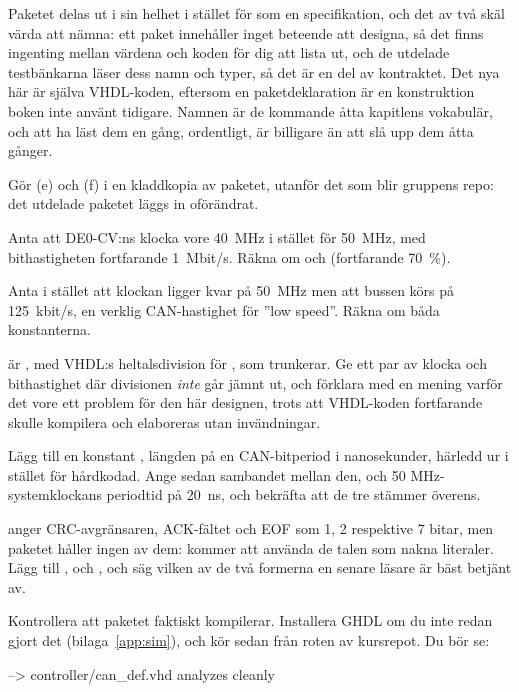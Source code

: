 Paketet delas ut i sin helhet i stället för som en specifikation, och det av två skäl värda att
nämna: ett paket innehåller inget beteende att designa, så det finns ingenting mellan värdena och
koden för dig att lista ut, och de utdelade testbänkarna läser dess namn och typer, så det är en del
av kontraktet. Det nya här är själva VHDL-koden, eftersom en paketdeklaration är en konstruktion
boken inte använt tidigare. Namnen är de kommande åtta kapitlens vokabulär, och att ha läst dem en
gång, ordentligt, är billigare än att slå upp dem åtta gånger.

Gör (e) och (f) i en kladdkopia av paketet, utanför det som blir gruppens repo: det utdelade paketet
läggs in oförändrat.

 Anta att DE0-CV:ns klocka vore 40~MHz i stället för 50~MHz, med bithastigheten fortfarande
1~Mbit/s. Räkna om  och  (fortfarande 70~\%).

 Anta i stället att klockan ligger kvar på 50~MHz men att bussen körs på 125~kbit/s, en
verklig CAN-hastighet för ”low speed”. Räkna om båda konstanterna.

  är , med VHDL:s heltalsdivision för
, som trunkerar. Ge ett par av klocka och bithastighet där divisionen \emph{inte} går
jämnt ut, och förklara med en mening varför det vore ett problem för den här designen, trots att
VHDL-koden fortfarande skulle kompilera och elaboreras utan invändningar.

 Lägg till en konstant , längden på en CAN-bitperiod i nanosekunder,
härledd ur  i stället för hårdkodad. Ange sedan sambandet mellan den,
 och 50 MHz-systemklockans periodtid på 20~ns, och bekräfta att de tre stämmer
överens.

  anger CRC-avgränsaren, ACK-fältet och EOF som 1, 2 respektive
7 bitar, men paketet håller ingen av dem:  kommer att använda de talen som nakna
literaler. Lägg till ,  och , och säg vilken av de
två formerna en senare läsare är bäst betjänt av.

 Kontrollera att paketet faktiskt kompilerar. Installera GHDL om du inte redan gjort det
(bilaga~\ref{app:sim}), och kör sedan  från roten av kursrepot. Du bör se:

\begin{console}
--> controller/can_def.vhd analyzes cleanly
\end{console}

